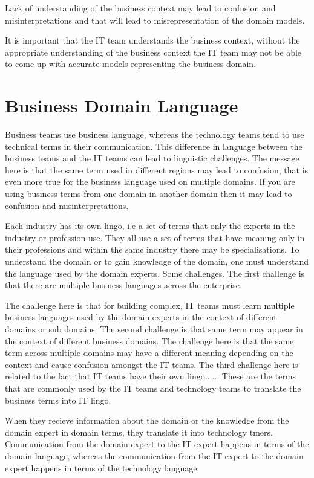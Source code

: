 \documentclass[a4paper, 11pt]{book}
\begin{document}
    Lack of understanding of the business context may lead to confusion and misinterpretations and that will lead to misrepresentation of the domain models.

    It is important that the IT team understands the business context, without the appropriate understanding of the business context the IT team may not be able to come up with accurate models representing the business domain.


    \section{Business Domain Language}
    Business teams use business language, whereas the technology teams tend to use technical terms in their communication.
    This difference in language between the business teams and the IT teams can lead to linguistic challenges.
    The message here is that the same term used in different regions may lead to confusion, that is even more true for the business language used on multiple domains.
    If you are using business terms from one domain in another domain then it may lead to confusion and misinterpretations.

    Each industry has its own lingo, i.e  a set of terms that only the experts in the industry or profession use.
    They all use a set of terms that have meaning only in their professions and within the same industry there may be specialisations.
    To understand the domain or to gain knowledge of the domain, one must understand the language used by the domain experts.
    Some challenges. The first challenge is that there are multiple business languages across the enterprise.

    The challenge here is that for building complex, IT teams must learn multiple business languages used by the domain experts in the context of different domains or sub domains.
    The second challenge is that same term may appear in the context of different business domains.
    The challenge here is that the same term across multiple domains may have a different meaning depending on the context and cause confusion amongst the IT teams.
    The third challenge here is related to the fact that IT teams have their own lingo......
    These are the terms that are commonly used by the IT teams and technology teams to translate the business terms into IT lingo.

    When they recieve information about the domain or the knowledge from the domain expert in domain terms, they translate it into technology tmers.
    Communication from the domain expert to the IT expert happens in terms of the domain language, whereas the communication from the IT expert to the domain expert happens in terms of the technology language.
\end{document}
